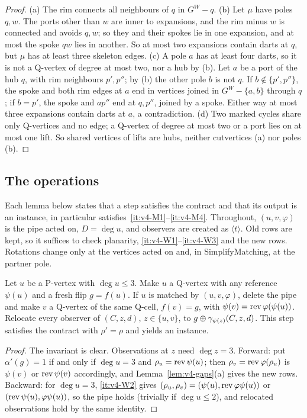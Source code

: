 \begin{proof}
(a) The rim connects all neighbours of $q$ in $G^W-q$. (b) Let $\mu$ have
poles $q,w$. The ports other than $w$ are inner to expansions, and the rim
minus $w$ is connected and avoids $q,w$; so they and their spokes lie in one
expansion, and at most the spoke $qw$ lies in another. So at most two
expansions contain darts at $q$, but $\mu$ has at least three skeleton
edges. (c) A pole $a$ has at least four darts, so it is not a Q-vertex of
degree at most two, nor a hub by (b). Let $a$ be a port of the hub $q$, with
rim neighbours $p',p''$; by (b) the other pole $b$ is not $q$. If
$b\notin\{p',p''\}$, the spoke and both rim edges at $a$ end in vertices
joined in $G^W-\{a,b\}$ through $q$; if $b=p'$, the spoke and $ap''$ end at
$q,p''$, joined by a spoke. Either way at most three expansions contain
darts at $a$, a contradiction. (d) Two marked cycles share only Q-vertices
and no edge; a Q-vertex of degree at most two or a port lies on at most one
lift. So shared vertices of lifts are hubs, neither cutvertices (a) nor
poles (b).
\end{proof}

\subsection{The operations}\label{sec:eng4-ops}

Each lemma below states that a step satisfies the contract and that its output is an instance, in
particular satisfies~\ref{it:v4-M1}--\ref{it:v4-M4}. Throughout,
$(u,v,\varphi)$ is the pipe acted on, $D=\deg u$, and observers are created
as $\langle t\rangle$. Old rows are kept, so it suffices to check planarity,
\ref{it:v4-W1}--\ref{it:v4-W3} and the new rows. Rotations change only at
the vertices acted on and, in SimplifyMatching, at the partner pole.



\begin{lemma}[ConvertSmall]\label{lem:eng4-convert}
Let $u$ be a P-vertex with $\deg u\le3$. Make $u$ a Q-vertex with any
reference $\psi(u)$ and a fresh flip $g=f(u)$. If $u$ is matched by
$(u,v,\varphi)$, delete the pipe and make $v$ a Q-vertex of the same Q-cell,
$f(v)=g$, with $\psi(v)=\operatorname{rev}\varphi(\psi(u))$. Relocate every observer of
$(C,z,d)$, $z\in\{u,v\}$, to $g\oplus\gamma_{\psi(z)}(C,z,d)$. This step
satisfies the contract with $\rho'=\rho$ and yields an instance.
\end{lemma}

\begin{proof}
The invariant is clear. Observations at $z$ need $\deg z=3$. Forward: put
$\alpha'(g)=1$ if and only if $\deg u=3$ and $\rho_u=\operatorname{rev}\psi(u)$; then
$\rho_v=\operatorname{rev}\varphi(\rho_u)$ is $\psi(v)$ or $\operatorname{rev}\psi(v)$ accordingly,
and Lemma~\ref{lem:v4-gaps}(a) gives the new rows. Backward: for $\deg u=3$,
\ref{it:v4-W2} gives $(\rho_u,\rho_v)=(\psi(u),\operatorname{rev}\varphi\psi(u))$ or
$(\operatorname{rev}\psi(u),\varphi\psi(u))$, so the pipe holds (trivially if $\deg u\le2$),
and relocated observations hold by the same identity.
\end{proof}

